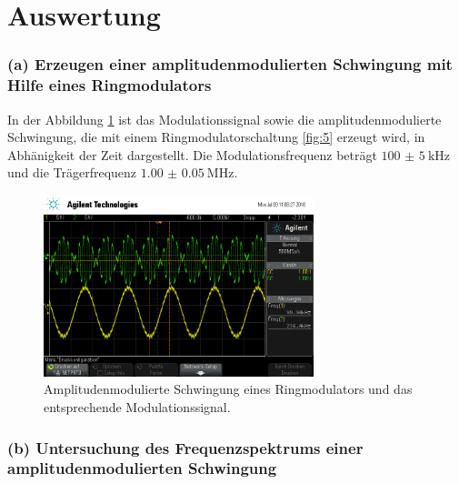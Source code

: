\section{Auswertung}
\label{sec:Auswertung}


\subsubsection{(a) Erzeugen einer amplitudenmodulierten Schwingung mit
Hilfe eines Ringmodulators}
\label{subsubsec:auswertung_a}
In der Abbildung \ref{fig:ringamp_zeit} ist das Modulationssignal
sowie die amplitudenmodulierte Schwingung, die mit einem Ringmodulatorschaltung \ref{fig:5}
erzeugt wird,
in Abhänigkeit der Zeit dargestellt.
Die Modulationsfrequenz beträgt $\SI{100(5)}{\kilo\hertz}$
und die Trägerfrequenz $\SI{1.00(5)}{\mega\hertz}$.
\begin{figure}
  \centering
  \includegraphics[width=0.7\textwidth]{osci/amp_ringmodulator.png}
  \caption{Amplitudenmodulierte
  Schwingung eines Ringmodulators und das entsprechende Modulationssignal.}
  \label{fig:ringamp_zeit}
\end{figure}


\subsubsection{(b) Untersuchung des Frequenzspektrums einer
amplitudenmodulierten Schwingung}
\label{subsubsec:auswertung_b}


